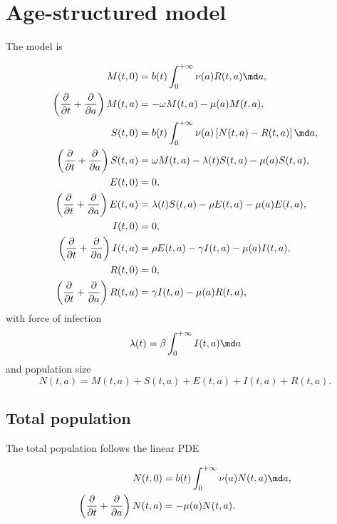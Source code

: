 \documentclass{jpmarticle}
\let\subequationsorig\subequations%
\let\endsubequationsorig\endsubequations%
\renewenvironment{subequations}{
  \subequationsorig
  \renewcommand{\theequation}{\theparentequation.\arabic{equation}}
}{
  \endsubequationsorig
}
\begin{document}
\section{Age-structured model}

The model is
\begin{subequations}
  \label{model_age_structured}
  \begin{align}
    M(t, 0)
    &= b(t) \int_0^{+\infty} \nu(a) R(t, a) \md a,
    \\
    \left(\frac{\partial}{\partial t}
      + \frac{\partial}{\partial a}\right)
    M(t, a)
    &= - \omega M(t, a) - \mu(a) M(t, a),
    \\
    S(t, 0)
    &= b(t) \int_0^{+\infty} \nu(a) \left[N(t, a) - R(t, a)\right] \md a,
    \\
    \left(\frac{\partial}{\partial t}
      + \frac{\partial}{\partial a}\right)
    S(t, a)
    &= \omega M(t, a) - \lambda(t) S(t, a) - \mu(a) S(t, a),
    \\
    E(t, 0)
    &= 0,
    \\
    \left(\frac{\partial}{\partial t}
      + \frac{\partial}{\partial a}\right)
    E(t, a)
    &= \lambda(t) S(t, a) - \rho E(t, a) - \mu(a) E(t, a),
    \\
    I(t, 0)
    &= 0,
    \\
    \left(\frac{\partial}{\partial t}
      + \frac{\partial}{\partial a}\right)
    I(t, a)
    &= \rho E(t, a) - \gamma I(t, a) - \mu(a) I(t, a),
    \\
    R(t, 0)
    &= 0,
    \\
    \left(\frac{\partial}{\partial t}
      + \frac{\partial}{\partial a}\right)
    R(t, a)
    &= \gamma I(t, a) - \mu(a) R(t, a),
  \end{align}
  with force of infection
  \begin{equation}
    \lambda(t) = \beta \int_0^{+\infty} I(t, a) \md a
  \end{equation}
  and population size
  \begin{equation}
    N(t, a) = M(t, a) + S(t, a) + E(t, a) + I(t, a) + R(t, a).
  \end{equation}
\end{subequations}


\subsection{Total population}

The total population follows the linear PDE
\begin{subequations}
  \begin{align}
    N(t, 0)
    &= b(t) \int_0^{+\infty} \nu(a) N(t, a) \md a,
    \\
    \left(\frac{\partial}{\partial t}
      + \frac{\partial}{\partial a}\right)
    N(t, a)
    &= - \mu(a) N(t, a).
  \end{align}
\end{subequations}
\end{document}
